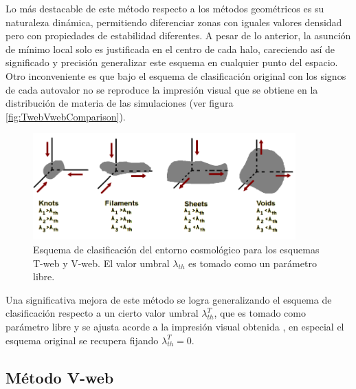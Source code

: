 Lo más destacable de este método respecto a los métodos geométricos es su 
naturaleza dinámica, permitiendo diferenciar zonas con iguales valores 
densidad pero con propiedades de estabilidad diferentes. A pesar de lo 
anterior, la asunción de mínimo local solo es justificada en el centro de 
cada halo, careciendo así de significado y precisión generalizar este 
esquema en cualquier punto del espacio. Otro inconveniente es que bajo el 
esquema de clasificación original con los signos de cada autovalor no se 
reproduce la impresión visual que se obtiene en la distribución de materia
de las simulaciones (ver figura \ref{fig:TwebVwebComparison}).


\begin{figure}[htbp]
	\centering
	\includegraphics[width=0.9\textwidth]
	{./figures/2_theoretical_framework/EnvironmentClassification.png}

	\caption{\small{Esquema de clasificación del entorno cosmológico 
	para los esquemas T-web y V-web. El valor umbral $\lambda_{th}$ es 
	tomado como un parámetro libre.}}
	
	\label{fig:ClassificationSchemeTweb}
\end{figure}


Una significativa mejora de este método se logra generalizando el esquema 
de clasificación respecto a un cierto valor umbral $\lambda_{th}^T$, que 
es tomado como parámetro libre y se ajusta acorde a la impresión visual 
obtenida \cite{forero2008}, en especial el esquema original se recupera 
fijando $\lambda_{th}^T=0$.


	\subsection{Método V-web}
	\label{subsec:TheV-webMethod}



